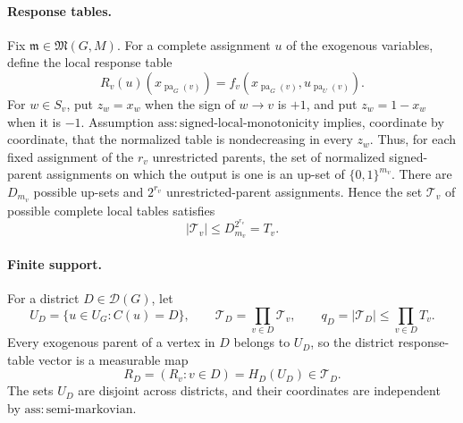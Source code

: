\paragraph{Response tables.}
Fix \(\mathfrak m\in\mathfrak M(G,M)\).  For a complete assignment \(u\) of the exogenous variables, define the local response table
\[
 R_v(u)(x_{\operatorname{pa}_G(v)})
 =f_v(x_{\operatorname{pa}_G(v)},u_{\operatorname{pa}_U(v)}).
\]
For \(w\in S_v\), put \(z_w=x_w\) when the sign of \(w\to v\) is \(+1\), and put \(z_w=1-x_w\) when it is \(-1\).  Assumption \(\mathrm{ass:signed\text{-}local\text{-}monotonicity}\) implies, coordinate by coordinate, that the normalized table is nondecreasing in every \(z_w\).  Thus, for each fixed assignment of the \(r_v\) unrestricted parents, the set of normalized signed-parent assignments on which the output is one is an up-set of \(\{0,1\}^{m_v}\).  There are \(D_{m_v}\) possible up-sets and \(2^{r_v}\) unrestricted-parent assignments.  Hence the set \(\mathcal T_v\) of possible complete local tables satisfies
\[
 |\mathcal T_v|\le D_{m_v}^{2^{r_v}}=T_v.
\]

\paragraph{Finite support.}
For a district \(D\in\mathcal D(G)\), let
\[
 U_D=\{u\in U_G:C(u)=D\},\qquad
 \mathcal T_D=\prod_{v\in D}\mathcal T_v,\qquad
 q_D=|\mathcal T_D|\le\prod_{v\in D}T_v.
\]
Every exogenous parent of a vertex in \(D\) belongs to \(U_D\), so the district response-table vector is a measurable map
\[
 R_D=(R_v:v\in D)=H_D(U_D)\in\mathcal T_D.
\]
The sets \(U_D\) are disjoint across districts, and their coordinates are independent by \(\mathrm{ass:semi\text{-}markovian}\).

